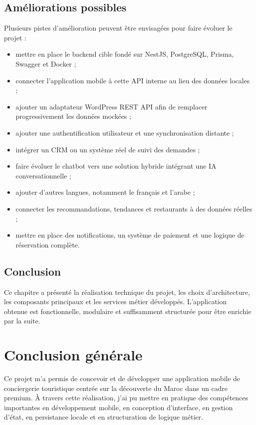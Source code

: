 \documentclass[12pt,a4paper]{report}
\begin{document}
\section{Améliorations possibles}

Plusieurs pistes d'amélioration peuvent être envisagées pour faire évoluer le projet :

\begin{itemize}
\item mettre en place le backend cible fondé sur NestJS, PostgreSQL, Prisma, Swagger et Docker ;
\item connecter l'application mobile à cette API interne au lieu des données locales ;
\item ajouter un adaptateur WordPress REST API afin de remplacer progressivement les données mockées ;
\item ajouter une authentification utilisateur et une synchronisation distante ;
\item intégrer un CRM ou un système réel de suivi des demandes ;
\item faire évoluer le chatbot vers une solution hybride intégrant une IA conversationnelle ;
\item ajouter d'autres langues, notamment le français et l'arabe ;
\item connecter les recommandations, tendances et restaurants à des données réelles ;
\item mettre en place des notifications, un système de paiement et une logique de réservation complète.
\end{itemize}

\section*{Conclusion}

Ce chapitre a présenté la réalisation technique du projet, les choix d'architecture, les composants principaux et les services métier développés. L'application obtenue est fonctionnelle, modulaire et suffisamment structurée pour être enrichie par la suite.

\chapter*{Conclusion générale}

Ce projet m'a permis de concevoir et de développer une application mobile de conciergerie touristique centrée sur la découverte du Maroc dans un cadre premium. À travers cette réalisation, j'ai pu mettre en pratique des compétences importantes en développement mobile, en conception d'interface, en gestion d'état, en persistance locale et en structuration de logique métier.
\end{document}

